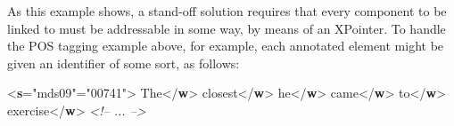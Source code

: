 As this example shows, a stand-off solution requires that every component to be linked to must be addressable in some way, by means of an XPointer. To handle the POS tagging example above, for example, each annotated element might be given an identifier of some sort, as follows: \par\bgroup{}\exampleFont \begin{shaded}\noindent\mbox{}{<\textbf{s}\hspace*{1em}{xml:id}="{mds09}"\hspace*{1em}{n}="{00741}">}\mbox{}\newline 
{}The{</\textbf{w}>}\mbox{}\newline 
{}closest{</\textbf{w}>}\mbox{}\newline 
{}he{</\textbf{w}>}\mbox{}\newline 
{}came{</\textbf{w}>}\mbox{}\newline 
{}to{</\textbf{w}>}\mbox{}\newline 
{}exercise{</\textbf{w}>}\mbox{}\newline 
\textit{<!-- ... -->}\mbox{}\newline 

\end{shaded}
